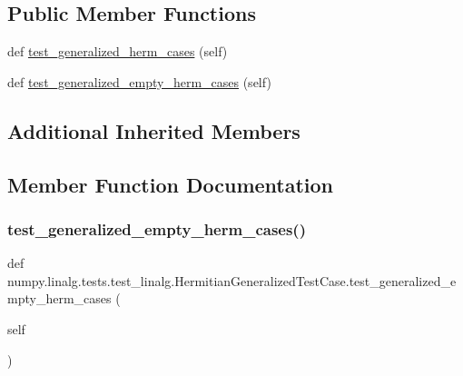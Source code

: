 \subsection*{Public Member Functions}
\begin{DoxyCompactItemize}
\item 
def \hyperlink{classnumpy_1_1linalg_1_1tests_1_1test__linalg_1_1HermitianGeneralizedTestCase_a0e0beb9bb43383e58d1a9cc371604029}{test\+\_\+generalized\+\_\+herm\+\_\+cases} (self)
\item 
def \hyperlink{classnumpy_1_1linalg_1_1tests_1_1test__linalg_1_1HermitianGeneralizedTestCase_a3cf3a32873c58aa340d42e53c4fa0820}{test\+\_\+generalized\+\_\+empty\+\_\+herm\+\_\+cases} (self)
\end{DoxyCompactItemize}
\subsection*{Additional Inherited Members}


\subsection{Member Function Documentation}
\mbox{\label{classnumpy_1_1linalg_1_1tests_1_1test__linalg_1_1HermitianGeneralizedTestCase_a3cf3a32873c58aa340d42e53c4fa0820}} 
\subsubsection{\texorpdfstring{test\+\_\+generalized\+\_\+empty\+\_\+herm\+\_\+cases()}{test\_generalized\_empty\_herm\_cases()}}
{\footnotesize\ttfamily def numpy.\+linalg.\+tests.\+test\+\_\+linalg.\+Hermitian\+Generalized\+Test\+Case.\+test\+\_\+generalized\+\_\+empty\+\_\+herm\+\_\+cases (\begin{DoxyParamCaption}\item[{}]{self }\end{DoxyParamCaption})}

